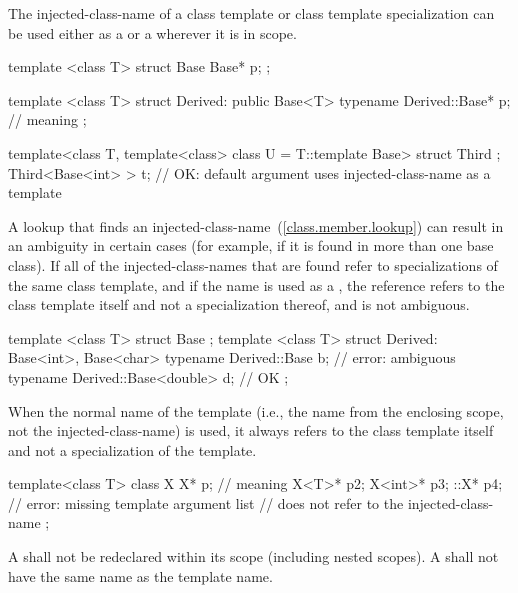 \pnum
The injected-class-name of a class template or class
template specialization can be used either
as a  or a 
wherever it is in scope.
\enterexample

\begin{codeblock}
template <class T> struct Base {
  Base* p;
};

template <class T> struct Derived: public Base<T> {
  typename Derived::Base* p;    // meaning 
};

template<class T, template<class> class U = T::template Base> struct Third { };
Third<Base<int> > t;            // OK: default argument uses injected-class-name as a template
\end{codeblock}
\exitexample

\pnum
A lookup that finds an injected-class-name~(\ref{class.member.lookup}) can result in an ambiguity in
certain cases (for example, if it is found in more than one
base class).
If all of the injected-class-names that are
found refer to specializations of the same class template,
and if the name
is used as a ,
the reference refers to the class template itself and not a
specialization thereof, and is not ambiguous.
\enterexample

\begin{codeblock}
template <class T> struct Base { };
template <class T> struct Derived: Base<int>, Base<char> {
  typename Derived::Base b;             // error: ambiguous
  typename Derived::Base<double> d;     // OK
};
\end{codeblock}
\exitexample

\pnum
When the normal name of the template (i.e., the name from
the enclosing scope, not the injected-class-name) is
used,
it always refers to the class template itself and not a
specialization of the template.
\enterexample

\begin{codeblock}
template<class T> class X {
  X* p;             // meaning 
  X<T>* p2;
  X<int>* p3;
  ::X* p4;          // error: missing template argument list
                    //  does not refer to the injected-class-name
};
\end{codeblock}
\exitexample

\pnum
A
shall not be redeclared within its scope (including nested scopes).
A
shall not have the same name as the template name.
\enterexample

